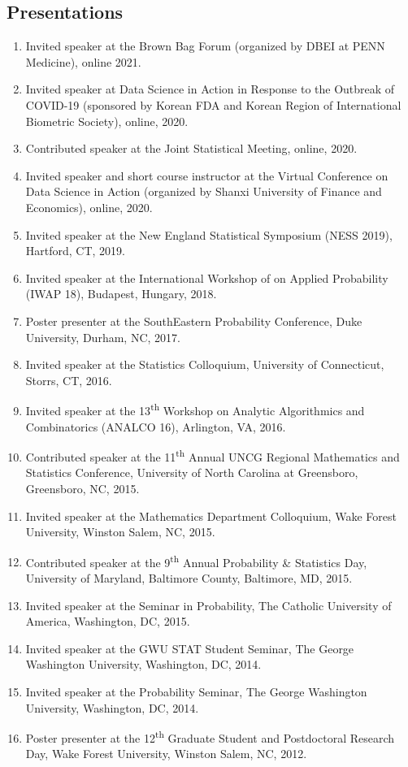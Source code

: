 \documentclass[margin]{res}
\begin{document}
\begin{resume}
\section{Presentations}
\begin{enumerate}
	\item Invited speaker at the Brown Bag Forum (organized by DBEI 
	at PENN Medicine), online 2021.
	\item Invited speaker at Data Science in Action in Response to 
	the Outbreak of COVID-19 (sponsored by Korean FDA and Korean 
	Region of International Biometric Society), online, 2020.
	\item Contributed speaker at the Joint Statistical Meeting, 
	online, 2020.
	\item Invited speaker and short course instructor at the Virtual 
	Conference on Data Science in Action (organized by Shanxi 
	University of Finance and Economics), online, 2020.
	\item Invited speaker at the New England Statistical Symposium (NESS 2019), Hartford, CT, 2019.
	\item Invited speaker at the International Workshop of on Applied Probability (IWAP 18), Budapest, Hungary, 2018.
	\item Poster presenter at the SouthEastern Probability Conference, Duke University, Durham, NC, 2017.
	\item Invited speaker at the Statistics Colloquium, University of Connecticut, Storrs, CT, 2016.
	\item Invited speaker at the 13\textsuperscript{th} Workshop on Analytic Algorithmics and Combinatorics (ANALCO 16), Arlington, VA, 2016.
	\item Contributed speaker at the 11\textsuperscript{th} Annual UNCG Regional Mathematics and Statistics Conference, University of North Carolina at Greensboro, Greensboro, NC, 2015.
	\item Invited speaker at the Mathematics Department Colloquium, Wake Forest University, Winston Salem, NC, 2015. 
	\item Contributed speaker at the 9\textsuperscript{th} Annual Probability \& Statistics Day, University of Maryland, Baltimore County, Baltimore, MD, 2015.
	\item Invited speaker at the Seminar in Probability, The Catholic University of America, Washington, DC, 2015.
	\item Invited speaker at the GWU STAT Student Seminar, The George Washington University, Washington, DC, 2014.
	\item Invited speaker at the Probability Seminar, The George Washington University, Washington, DC, 2014.
	\item Poster presenter at the 12\textsuperscript{th} Graduate Student and Postdoctoral Research Day, Wake Forest University, Winston Salem, NC, 2012.
\end{enumerate}


\end{resume}
\end{document}
